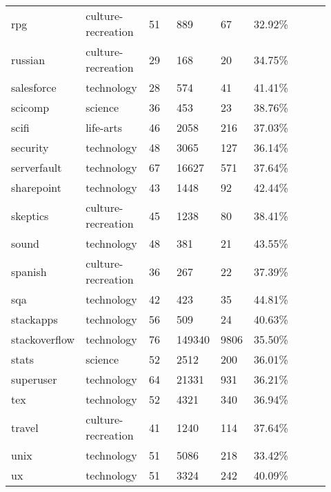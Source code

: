 \begin{longtabu}{@{}
	p{0.17\linewidth}
	p{0.2\linewidth}
	P{0.1\linewidth}
	P{0.1\linewidth}
	P{0.1\linewidth}
	P{0.1\linewidth}
	p{0.15\linewidth}@{}}
rpg              & culture-recreation & 51    & 889              & 67      & 32.92\%     \\
russian          & culture-recreation & 29    & 168              & 20      & 34.75\%     \\
salesforce       & technology         & 28    & 574              & 41      & 41.41\%     \\
scicomp          & science            & 36    & 453              & 23      & 38.76\%     \\
scifi            & life-arts          & 46    & 2058             & 216     & 37.03\%     \\
security         & technology         & 48    & 3065             & 127     & 36.14\%     \\
serverfault      & technology         & 67    & 16627            & 571     & 37.64\%     \\
sharepoint       & technology         & 43    & 1448             & 92      & 42.44\%     \\
skeptics         & culture-recreation & 45    & 1238             & 80      & 38.41\%     \\
sound            & technology         & 48    & 381              & 21      & 43.55\%     \\
spanish          & culture-recreation & 36    & 267              & 22      & 37.39\%     \\
sqa              & technology         & 42    & 423              & 35      & 44.81\%     \\
stackapps        & technology         & 56    & 509              & 24      & 40.63\%     \\
stackoverflow    & technology         & 76    & 149340           & 9806    & 35.50\%     \\
stats            & science            & 52    & 2512             & 200     & 36.01\%     \\
superuser        & technology         & 64    & 21331            & 931     & 36.21\%     \\
tex              & technology         & 52    & 4321             & 340     & 36.94\%     \\
travel           & culture-recreation & 41    & 1240             & 114     & 37.64\%     \\
unix             & technology         & 51    & 5086             & 218     & 33.42\%     \\
ux               & technology         & 51    & 3324             & 242     & 40.09\%     \\

\end{longtabu}
